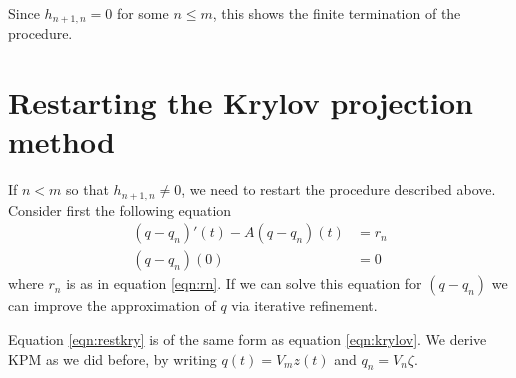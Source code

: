 Since $h_{n+1,n} = 0$ for some $n \leq m$, this shows the finite termination of the procedure.


\section{Restarting the Krylov projection method} \label{sec:rest}
If $n < m$ so that $h_{n+1,n} \neq 0$, we need to restart the procedure described above. Consider first the following equation
\begin{equation}\label{eqn:restkry}
\begin{aligned}
 (q-q_n)'(t) -A (q-q_n)(t) &= r_n \\
(q-q_n)(0)& = 0
\end{aligned}
\end{equation}
where $r_n$ is as in equation \eqref{eqn:rn}. If we can solve this equation for $(q-q_n)$ we can improve the approximation of $q$ via iterative refinement.

Equation \eqref{eqn:restkry} is of the same form as equation \eqref{eqn:krylov}. We derive KPM as we did before, by writing $q(t) = V_m z(t)$ and $q_n = V_n \zeta $.

